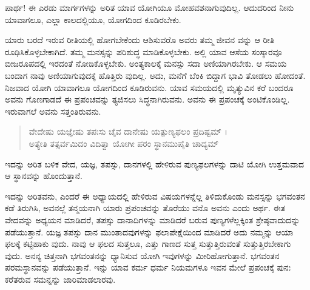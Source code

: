 {\small ಪಾರ್ಥ! ಈ ಎರಡು ಮಾರ್ಗಗಳನ್ನು ಅರಿತ ಯಾವ ಯೋಗಿಯೂ ಮೋಹವಶನಾಗುವುದಿಲ್ಲ. ಆದುದರಿಂದ ನೀನು ಯಾವಾಗಲೂ, ಎಲ್ಲಾ ಕಾಲದಲ್ಲಿಯೂ, ಯೋಗದಿಂದ ಕೂಡಿರಬೇಕು.}

ಯಾರು ಬರದೆ ಇರುವ ರೀತಿಯಲ್ಲಿ ಹೋಗಬೇಕೆಂದು ಆಶಿಸುವರೊ ಅವರು ತಮ್ಮ ಜೀವನ ವನ್ನು ಆ ರೀತಿ ರೂಢಿಸಿಕೊಳ್ಳಬೇಕಾಗಿದೆ. ತಮ್ಮ ಮನಸ್ಸನ್ನು ಪರಿಶುದ್ಧ ಮಾಡಿಕೊಳ್ಳಬೇಕು. ಅಲ್ಲಿ ಯಾವ ಆಸೆಯ ಸಂಸ್ಕಾರವೂ ಬೀಜರೂಪದಲ್ಲಿ ಇರದಂತೆ ನೋಡಿಕೊಳ್ಳಬೇಕು. ಅಂತ್ಯಕಾಲಕ್ಕೆ ಮನಸ್ಸು ಸದಾ ಅಣಿಯಾಗಿರಬೇಕು. ಆ ಸಮಯ ಬಂದಾಗ ನಾವು ಅಣಿಯಾಗುವುದಕ್ಕೆ ಹೊತ್ತಿರು ವುದಿಲ್ಲ. ಅದು, ಮನೆಗೆ ಬೆಂಕಿ ಬಿದ್ದಾಗ ಭಾವಿ ತೋಡಲು ಹೋದಂತೆ. ನಿಜವಾದ ಯೋಗಿ ಯಾವಾಗಲೂ ಯೋಗದಿಂದ ಕೂಡಿರುವನು. ಯಾವ ಸಮಯದಲ್ಲಿ ಮೃತ್ಯುವಿನ ಕರೆ ಬಂದರೂ ಅವನು ಗೊಣಗಾಡದೆ ಈ ಪ್ರಪಂಚವನ್ನು ತ್ಯಜಿಸಲು ಸಿದ್ಧನಾಗಿರುವನು. ಅವನು ಈ ಪ್ರಪಂಚಕ್ಕೆ ಅಂಟಿಕೊಂಡಿಲ್ಲ. ಇರುವಾಗಲೆ ಅವನು ಸತ್ತಂತಿರುವನು.

\begin{verse}
ವೇದೇಷು ಯಜ್ಞೇಷು ತಪಃಸು ಚೈವ ದಾನೇಷು ಯತ್ಪುಣ್ಯಫಲಂ ಪ್ರದಿಷ್ಟಮ್ ।\\ಅತ್ಯೇತಿ ತತ್ಸರ್ವಮಿದಂ ವಿದಿತ್ವಾ ಯೋಗೀ ಪರಂ ಸ್ಥಾನಮುಪೈತಿ ಚಾದ್ಯಮ್ 
\end{verse}

{\small ಇದನ್ನು ಅರಿತ ಬಳಿಕ ವೇದ, ಯಜ್ಞ, ತಪಸ್ಸು, ದಾನಗಳಲ್ಲಿ ಹೇಳಿರುವ ಪುಣ್ಯಫಲಗಳನ್ನು ದಾಟಿ ಯೋಗಿ ಉತ್ತಮವಾದ ಆ ಸ್ಥಾನವನ್ನು ಹೊಂದುತ್ತಾನೆ. }

ಇದನ್ನು ಅರಿತವನು, ಎಂದರೆ ಈ ಅಧ್ಯಾಯದಲ್ಲಿ ಹೇಳಿರುವ ವಿಷಯಗಳನ್ನೆಲ್ಲ ತಿಳಿದುಕೊಂಡು ಮನಸ್ಸನ್ನು ಭಗವಂತನ ಕಡೆ ತಿರುಗಿಸಿ, ಅವನಲ್ಲೆ ತನ್ಮಯನಾಗಿ ಯಾರು ಪ್ರಪಂಚವನ್ನು ತೊರೆಯು ವನೊ ಅವನು ಎಂದು ಅರ್ಥ. ಈತ ವೇದವನ್ನು ಅಧ್ಯಯನ ಮಾಡಿದರೆ, ತಪಸ್ಸು ದಾನಾದಿಗಳನ್ನು ಮಾಡಿದರೆ ಬರುವ ಪುಣ್ಯಗಳೆಲ್ಲಕ್ಕಿಂತ ಶ್ರೇಷ್ಠವಾದುದನ್ನು ಪಡೆಯುತ್ತಾನೆ. ಯಜ್ಞ ತಪಸ್ಸು ದಾನ ಮುಂತಾದವುಗಳನ್ನು ಫಲಾಪೇಕ್ಷೆಯಿಂದ ಮಾಡಿದರೆ ಅದು ನಮ್ಮನ್ನು ಆಯಾ ಫಲಕ್ಕೆ ಕಟ್ಟಿಹಾಕು ವುದು. ನಾವು ಆ ಫಲದ ಸುತ್ತಲೂ, ಎತ್ತು ಗಾಣದ ಸುತ್ತ ಸುತ್ತುತ್ತಿರುವಂತೆ ಸುತ್ತುತ್ತಿರಬೇಕಾಗು ವುದು. ಅನನ್ಯ ಚಿತ್ತನಾಗಿ ಭಗವಂತನನ್ನು ಧ್ಯಾನಿಸುವ ಯೋಗಿ ಇವುಗಳನ್ನು ಮೀರಿಹೋಗುತ್ತಾನೆ. ಭಗವಂತನ ಪರಮಸ್ಥಾನವನ್ನು ಪಡೆಯುತ್ತಾನೆ. ಇನ್ನು ಯಾವ ಕರ್ಮ ಧರ್ಮ ನಿಯಮಗಳೂ ಇವನ ಮೇಲೆ ಪ್ರಪಂಚಕ್ಕೆ ಪುನಃ ಕರೆತರುವ ಸಮನ್ನನ್ನು ಜಾರಿಮಾಡಲಾರವು.

